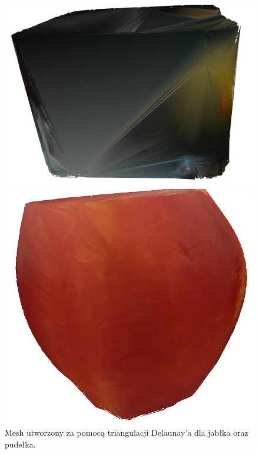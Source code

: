 \begin{figure}[H]
\centering
    \begin{minipage}[b]{0.45\linewidth}
        \includegraphics[scale=0.2]{delaunayBox.PNG}
    \end{minipage}
\quad
    \begin{minipage}[b]{0.45\linewidth}
        \includegraphics[scale=0.2]{jablkoDelNowe.PNG}
    \end{minipage}
\caption{Mesh utworzony za pomocą triangulacji Delaunay'a dla jabłka oraz pudełka.}
\label{fig:delaAppleBoxComp}
\end{figure}

